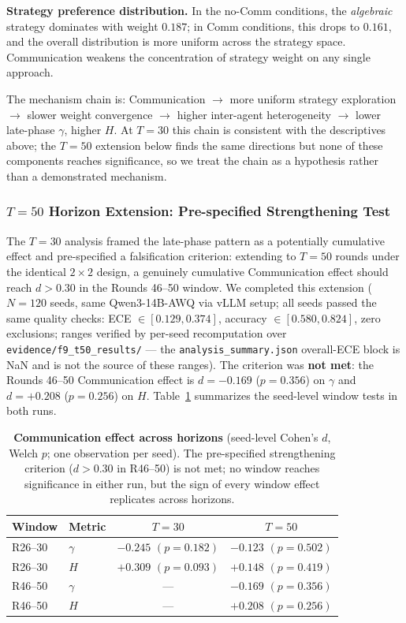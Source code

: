 \documentclass[11pt]{article}
\theoremstyle{definition}
\theoremstyle{remark}
\begin{document}
\textbf{Strategy preference distribution.} In the no-Comm conditions, the \textit{algebraic} strategy dominates with weight $0.187$; in Comm conditions, this drops to $0.161$, and the overall distribution is more uniform across the strategy space. Communication weakens the concentration of strategy weight on any single approach.

The mechanism chain is: Communication $\rightarrow$ more uniform strategy exploration $\rightarrow$ slower weight convergence $\rightarrow$ higher inter-agent heterogeneity $\rightarrow$ lower late-phase $\gamma$, higher $H$. At $T{=}30$ this chain is consistent with the descriptives above; the $T{=}50$ extension below finds the same directions but none of these components reaches significance, so we treat the chain as a hypothesis rather than a demonstrated mechanism.

\subsubsection{$T{=}50$ Horizon Extension: Pre-specified Strengthening Test}

The $T{=}30$ analysis framed the late-phase pattern as a potentially cumulative effect and pre-specified a falsification criterion: extending to $T{=}50$ rounds under the identical $2 \times 2$ design, a genuinely cumulative Communication effect should reach $d > 0.30$ in the Rounds 46--50 window. We completed this extension ($N{=}120$ seeds, same Qwen3-14B-AWQ via vLLM setup; all seeds passed the same quality checks: ECE $\in [0.129, 0.374]$, accuracy $\in [0.580, 0.824]$, zero exclusions; ranges verified by per-seed recomputation over \texttt{evidence/f9\_t50\_results/} --- the \texttt{analysis\_summary.json} overall-ECE block is NaN and is not the source of these ranges). The criterion was \textbf{not met}: the Rounds 46--50 Communication effect is $d{=}-0.169$ ($p{=}0.356$) on $\gamma$ and $d{=}+0.208$ ($p{=}0.256$) on $H$. Table~\ref{tab:t50_extension} summarizes the seed-level window tests in both runs.

\begin{table}[H]
\centering
\caption{\textbf{Communication effect across horizons} (seed-level Cohen's $d$, Welch $p$; one observation per seed). The pre-specified strengthening criterion ($d > 0.30$ in R46--50) is not met; no window reaches significance in either run, but the sign of every window effect replicates across horizons.}
\label{tab:t50_extension}
\begin{tabular}{@{}llcc@{}}
\toprule
Window & Metric & $T{=}30$ & $T{=}50$ \\
\midrule
R26--30 & $\gamma$ & $-0.245$ $(p{=}0.182)$ & $-0.123$ $(p{=}0.502)$ \\
R26--30 & $H$ & $+0.309$ $(p{=}0.093)$ & $+0.148$ $(p{=}0.419)$ \\
R46--50 & $\gamma$ & --- & $-0.169$ $(p{=}0.356)$ \\
R46--50 & $H$ & --- & $+0.208$ $(p{=}0.256)$ \\
\bottomrule
\end{tabular}
\end{table}
\end{document}
